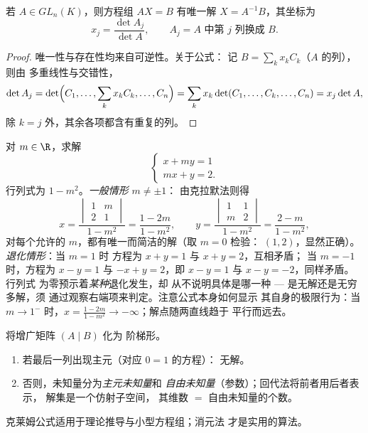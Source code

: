 \begin{theorem}[方阵的克拉默方程组]\label{thm:b1:det:cramer}
若 $A \in GL_n(K)$，则方程组 $AX = B$ 有唯一解 $X =
A^{-1}B$，其坐标为
\[
x_j = \frac{\det A_j}{\det A},
\qquad A_j = A \text{ 中第 } j \text{ 列换成 } B .
\]
\end{theorem}

\begin{proof}
唯一性与存在性均来自可逆性。关于公式：
记 $B = \sum_k x_k C_k$（$A$ 的列），则由
多重线性与交错性，
\[
\det A_j = \det\Bigl(C_1, \dots, \sum_k x_k C_k, \dots, C_n\Bigr)
= \sum_k x_k \det(C_1, \dots, C_k, \dots, C_n)
= x_j \det A ,
\]
除 $k = j$ 外，其余各项都含有重复的列。
\end{proof}

\begin{example}[含参数的克拉默法则完整示例]
\label{ex:b1:det:cramerparameter}
对 $m \in \R$，求解
\[
\begin{cases}
x + m y = 1\\
m x + y = 2 .
\end{cases}
\]
行列式为 $1 - m^2$。\emph{一般情形} $m \neq \pm1$：
由克拉默法则得
\[
x = \frac{\begin{vmatrix} 1 & m\\ 2 & 1\end{vmatrix}}{1 - m^2}
= \frac{1 - 2m}{1 - m^2},
\qquad
y = \frac{\begin{vmatrix} 1 & 1\\ m & 2\end{vmatrix}}{1 - m^2}
= \frac{2 - m}{1 - m^2},
\]
对每个允许的 $m$，都有唯一而简洁的解（取 $m = 0$ 检验：
$(1, 2)$，显然正确）。\emph{退化情形}：当 $m = 1$ 时
方程为 $x + y = 1$ 与 $x + y = 2$，互相矛盾；
当 $m = -1$ 时，方程为 $x - y = 1$ 与 $-x + y = 2$，即 $x - y =
1$ 与 $x - y = -2$，同样矛盾。行列式
为零预示着\emph{某种}退化发生，却
从不说明具体是哪一种 --- 是无解还是无穷多解，须
通过观察右端项来判定。注意公式本身如何显示
其自身的极限行为：当 $m \to 1^{-}$ 时，$x = \frac{1 - 2m}{1 - m^2} \to
-\infty$；解点随两直线趋于
平行而远去。
\end{example}

\begin{method}[用高斯消元法解方程组]\label{met:b1:det:gauss}
将增广矩阵 $(A \mid B)$ 化为
阶梯形。
\begin{enumerate}
  \item 若最后一列出现主元（对应 $0 = 1$ 的方程）：
        无解。
  \item 否则，未知量分为\emph{主元未知量}和
        \emph{自由未知量}（参数）；回代法将前者用后者表示，
        解集是一个仿射子空间，
        其维数 $=$ 自由未知量的个数。
\end{enumerate}
克莱姆公式适用于理论推导与小型方程组；消元法
才是实用的算法。
\end{method}

